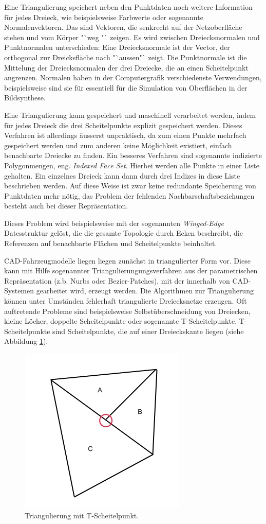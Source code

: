 Eine Triangulierung speichert neben den Punktdaten noch weitere Information f\"ur jedes Dreieck, wie beispielsweise Farbwerte oder sogenannte Normalenvektoren. Das sind Vektoren, die senkrecht auf der Netzoberfläche stehen und vom K\"orper  "`weg "` zeigen. Es wird zwischen Dreiecksnormalen und Punktnormalen unterschieden: Eine Dreiecksnormale ist der Vector, der orthogonal zur Dreicksfläche nach "`aussen"` zeigt. Die Punktnormale ist die Mittelung der  Dreiecksnormalen der drei Dreiecke, die an einen Scheitelpunkt angrenzen. Normalen haben in der Computergrafik verschiedenste Verwendungen, beispielsweise sind sie für essentiell f\"ur die Simulation von Oberfl\"achen in der Bildsynthese.

Eine Triangulierung kann gespeichert und maschinell verarbeitet werden, indem f\"ur jedes Dreieck die drei Scheitelpunkte explizit gespeichert werden. Dieses Verfahren ist allerdings \"ausserst unpraktisch, da zum einen Punkte mehrfach gespeichert werden und zum anderen keine M\"oglichkeit existiert, einfach benachbarte Dreiecke zu finden. Ein besseres Verfahren sind sogenannte indizierte Polygonmengen, eng. \textit{Indexed Face Set}. Hierbei werden alle Punkte in einer Liste gehalten. Ein einzelnes Dreieck kann dann durch drei Indizes in diese Liste beschrieben werden. Auf diese Weise ist zwar keine redundante Speicherung von Punktdaten mehr n\"otig, das Problem der fehlenden Nachbarschaftsbeziehungen besteht auch bei dieser Repr\"asentation. 

Dieses Problem wird beispielsweise mit der sogenannten \textit{Winged-Edge} Datesstruktur gel\"ost, die die gesamte Topologie durch Ecken beschreibt, die Referenzen auf benachbarte Fl\"achen und Scheitelpunkte beinhaltet. 

CAD-Fahrzeugmodelle liegen liegen zunächst in triangulierter Form vor. Diese kann mit Hilfe sogenannter Triangulierungungsverfahren aus der parametrischen Repr\"asentation (z.b. Nurbs oder Bezier-Patches), mit der innerhalb von CAD-Systemen gearbeitet wird, erzeugt werden. Die Algorithmen zur Triangulierung k\"onnen unter Umst\"anden fehlerhaft triangulierte Dreiecksnetze erzeugen. Oft auftretende Probleme sind beispielsweise Selbst\"uberschneidung von Dreiecken, kleine L\"ocher, doppelte Scheitelpunkte oder sogenannte T-Scheitelpunkte. T-Scheitelpunkte sind Scheitelpunkte, die auf einer Dreieckskante liegen (siehe Abbildung \ref{tvertice}). 

\begin{figure}[H]
\centerline{
	\includegraphics[width=0.4\columnwidth]{graphics/tvertices.jpg}
}
\caption{Triangulierung mit T-Scheitelpunkt.}
\label{tvertice}
\end{figure}

